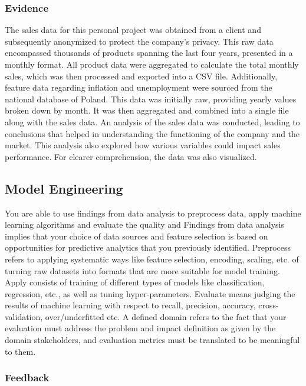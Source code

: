 \documentclass[a4paper, 11pt]{article}
\begin{document}
\subsubsection{Evidence}
The sales data for this personal project was obtained from a client and subsequently anonymized to protect the company's privacy. This raw data encompassed thousands of products spanning the last four years, presented in a monthly format. All product data were aggregated to calculate the total monthly sales, which was then processed and exported into a CSV file.
Additionally, feature data regarding inflation and unemployment were sourced from the national database of Poland. This data was initially raw, providing yearly values broken down by month. It was then aggregated and combined into a single file along with the sales data. An analysis of the sales data was conducted, leading to conclusions that helped in understanding the functioning of the company and the market. This analysis also explored how various variables could impact sales performance. For clearer comprehension, the data was also visualized.

\subsection{Model Engineering}
You are able to use findings from data analysis to preprocess data, apply machine learning algorithms and evaluate the quality and 
\medbreak
Findings from data analysis implies that your choice of data sources and feature selection is based on opportunities for predictive analytics that you previously identified. Preprocess refers to applying systematic ways like feature selection, encoding, scaling, etc. of turning raw datasets into formats that are more suitable for model training. Apply consists of training of different types of models like classification, regression, etc., as well as tuning hyper-parameters. Evaluate means judging the results of machine learning with respect to recall, precision, accuracy, cross-validation, over/underfitted etc. A defined domain refers to the fact that your evaluation must address the problem and impact definition as given by the domain stakeholders, and evaluation metrics must be translated to be meaningful to them.
\subsubsection{Feedback}
\end{document}

